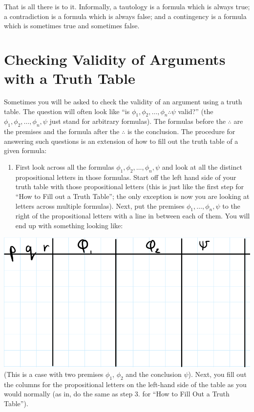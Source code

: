 \documentclass[
]{book}
\providecommand{\tightlist}{%
  \setlength{\itemsep}{0pt}\setlength{\parskip}{0pt}}
\begin{document}
That is all there is to it. Informally, a tautology is a formula which is always true; a contradiction is a formula which is always false; and a contingency is a formula which is sometimes true and sometimes false.

\hypertarget{checking-validity-of-arguments-with-a-truth-table}{%
\section{Checking Validity of Arguments with a Truth Table}\label{checking-validity-of-arguments-with-a-truth-table}}

Sometimes you will be asked to check the validity of an argument using a truth table. The question will often look like ``is \(\phi_1,\phi_2,\ldots,\phi_n \therefore \psi\) valid?'' (the \(\phi_1,\phi_2,\ldots,\phi_n,\psi\) just stand for arbitrary formulas). The formulas before the \(\therefore\) are the premises and the formula after the \(\therefore\) is the conclusion. The procedure for answering such questions is an extension of how to fill out the truth table of a given formula:

\begin{enumerate}
\def\labelenumi{\arabic{enumi}.}
\tightlist
\item
  First look across all the formulas \(\phi_1,\phi_2,\ldots,\phi_n, \psi\) and look at all the distinct propositional letters in those formulas. Start off the left hand side of your truth table with those propositional letters (this is just like the first step for ``How to Fill out a Truth Table''; the only exception is now you are looking at letters across multiple formulas). Next, put the premises \(\phi_1,\ldots,\phi_n,\psi\) to the right of the propositional letters with a line in between each of them. You will end up with something looking like:
\end{enumerate}

\includegraphics{Pictures/Week4Picture12.png}
(This is a case with two premises \(\phi_1\), \(\phi_2\) and the conclusion \(\psi\)). Next, you fill out the columns for the propositional letters on the left-hand side of the table as you would normally (as in, do the same as step 3. for ``How to Fill Out a Truth Table'').
\end{document}
